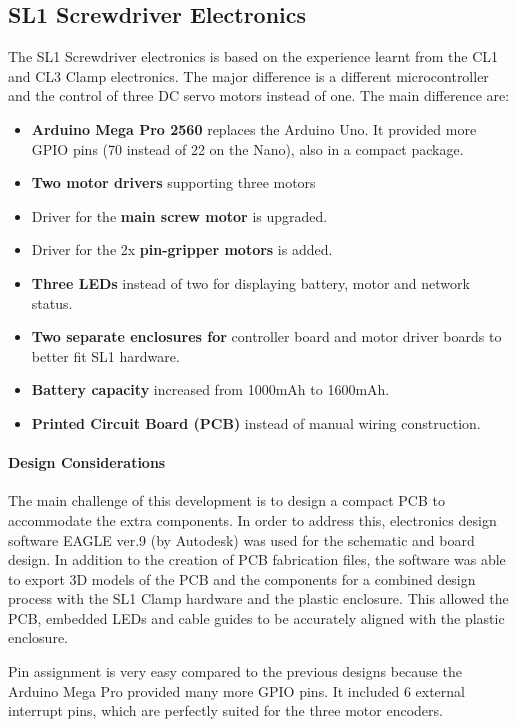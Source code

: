 \subsection{SL1 Screwdriver Electronics}
The SL1 Screwdriver electronics is based on the experience learnt from the CL1 and CL3 Clamp electronics. The major difference is a different microcontroller and the control of three DC servo motors instead of one. The main difference are:
\begin{itemize}
    \item \textbf{Arduino Mega Pro 2560} replaces the Arduino Uno. It provided more GPIO pins (70 instead of 22 on the Nano), also in a compact package.
    \item \textbf{Two motor drivers} supporting three motors
    \item Driver for the \textbf{main screw motor} is upgraded.
    \item Driver for the 2x \textbf{pin-gripper motors} is added.
    \item \textbf{Three LEDs} instead of two for displaying battery, motor and network status.
    \item \textbf{Two separate enclosures for }controller board and motor driver boards to better fit SL1 hardware.
    \item \textbf{Battery capacity} increased from 1000mAh to 1600mAh.
    \item \textbf{Printed Circuit Board (PCB)} instead of manual wiring construction.
\end{itemize}

\paragraph{Design Considerations}
The main challenge of this development is to design a compact PCB to accommodate the extra components. In order to address this, electronics design software EAGLE ver.9 (by Autodesk) was used for the schematic and board design. In addition to the creation of PCB fabrication files, the software was able to export 3D models of the PCB and the components for a combined design process with the SL1 Clamp hardware and the plastic enclosure. This allowed the PCB, embedded LEDs and cable guides to be accurately aligned with the plastic enclosure.

Pin assignment is very easy compared to the previous designs because the Arduino Mega Pro provided many more GPIO pins. It included 6 external interrupt pins, which are perfectly suited for the three motor encoders.  

